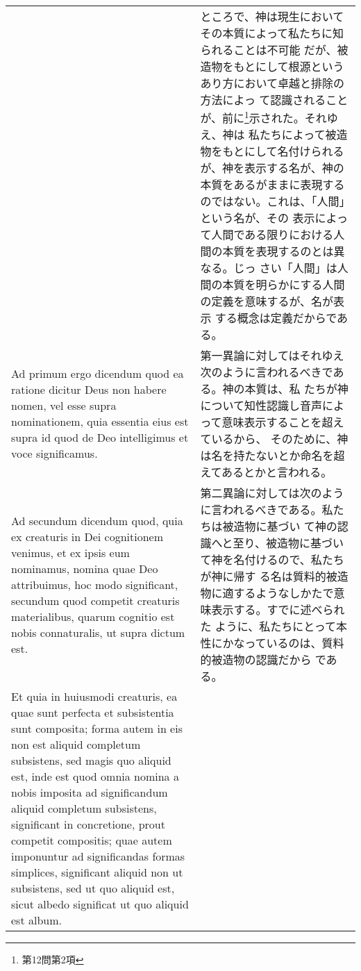 \documentclass[10pt]{jsarticle}
\begin{document}
\begin{longtable}{p{21em}p{21em}}
&

ところで、神は現生においてその本質によって私たちに知られることは不可能
だが、被造物をもとにして根源というあり方において卓越と排除の方法によっ
て認識されることが、前に\footnote{第12問第2項}示された。それゆえ、神は
私たちによって被造物をもとにして名付けられるが、神を表示する名が、神の
本質をあるがままに表現するのではない。これは、「人間」という名が、その
表示によって人間である限りにおける人間の本質を表現するのとは異なる。じっ
さい「人間」は人間の本質を明らかにする人間の定義を意味するが、名が表示
する概念は定義だからである。

\\

{\sc Ad primum ergo dicendum} quod ea ratione dicitur Deus non habere
nomen, vel esse supra nominationem, quia essentia eius est supra id
quod de Deo intelligimus et voce significamus.

&

第一異論に対してはそれゆえ次のように言われるべきである。神の本質は、私
たちが神について知性認識し音声によって意味表示することを超えているから、
そのために、神は名を持たないとか命名を超えてあるとかと言われる。

\\

{\sc Ad secundum dicendum} quod, quia ex creaturis in Dei cognitionem
venimus, et ex ipsis eum nominamus, nomina quae Deo attribuimus, hoc
modo significant, secundum quod competit creaturis materialibus, quarum
cognitio est nobis connaturalis, ut supra dictum est. 

&

第二異論に対しては次のように言われるべきである。私たちは被造物に基づい
て神の認識へと至り、被造物に基づいて神を名付けるので、私たちが神に帰す
る名は質料的被造物に適するようなしかたで意味表示する。すでに述べられた
ように、私たちにとって本性にかなっているのは、質料的被造物の認識だから
である。

\\

Et quia in huiusmodi creaturis, ea quae sunt perfecta et subsistentia
sunt composita; forma autem in eis non est aliquid completum
subsistens, sed magis quo aliquid est, inde est quod omnia nomina a
nobis imposita ad significandum aliquid completum subsistens,
significant in concretione, prout competit compositis; quae autem
imponuntur ad significandas formas simplices, significant aliquid non
ut subsistens, sed ut quo aliquid est, sicut albedo significat ut quo
aliquid est album.

&


\end{longtable}
\end{document}
